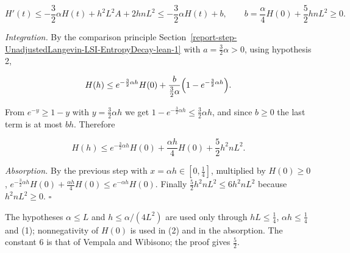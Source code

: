\documentclass[11pt,a4paper]{report}
\begin{document}
\[H'(t)\le-\frac32\alpha H(t)+h^2L^2A+2hnL^2\le-\frac32\alpha H(t)+b,\qquad b=\frac\alpha4H(0)+\frac52hnL^2\ge0.\]


\emph{Integration.} By the comparison principle Section~\ref{report-step-UnadjustedLangevin-LSI-EntropyDecay-lean-1} with \(a=\frac32\alpha>0\), using hypothesis 2,


\[H(h)\le e^{-\frac32\alpha h}H(0)+\frac{b}{\frac32\alpha}\Bigl(1-e^{-\frac32\alpha h}\Bigr).\]


From \(e^{-y}\ge1-y\) with \(y=\frac32\alpha h\) we get \(1-e^{-\frac32\alpha h}\le\frac32\alpha h\), and since \(b\ge0\) the last term is at most \(bh\). Therefore


\[H(h)\le e^{-\frac32\alpha h}H(0)+\frac{\alpha h}4H(0)+\frac52h^2nL^2.\]


\emph{Absorption.} By the previous step with \(x=\alpha h\in[0,\frac14]\), multiplied by \(H(0)\ge0\), \(e^{-\frac32\alpha h}H(0)+\frac{\alpha h}4H(0)\le e^{-\alpha h}H(0)\). Finally \(\frac52h^2nL^2\le6h^2nL^2\) because \(h^2nL^2\ge0\). \(\square\)




The hypotheses \(\alpha\le L\) and \(h\le\alpha/(4L^2)\) are used only through \(hL\le\frac14\), \(\alpha h\le\frac14\) and (1); nonnegativity of \(H(0)\) is used in (2) and in the absorption. The constant \(6\) is that of Vempala and Wibisono; the proof gives \(\frac52\).
\end{document}
